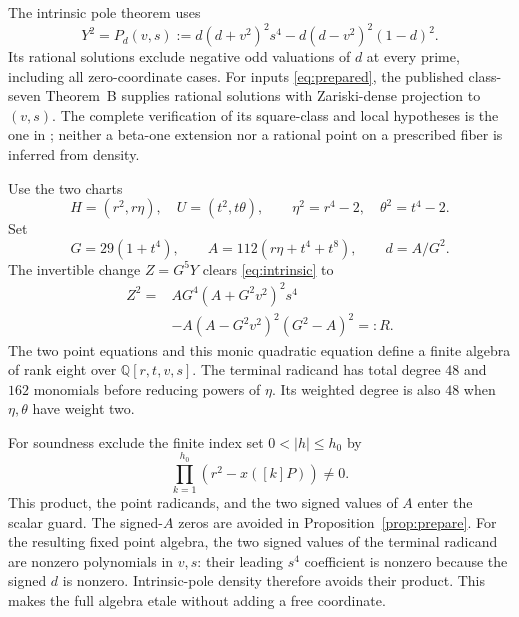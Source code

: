 \documentclass[11pt]{article}
\newcommand{\Q}{\mathbb Q}
\begin{document}
The intrinsic pole theorem \cite{Intrinsic,Burungale} uses
\begin{equation}\label{eq:intrinsic}
 Y^2=P_d(v,s)
   :=d(d+v^2)^2s^4-d(d-v^2)^2(1-d)^2.
\end{equation}
Its rational solutions exclude negative odd valuations of \(d\)
at every prime, including all zero-coordinate cases. For inputs
\eqref{eq:prepared}, the published class-seven Theorem~B supplies
rational solutions with Zariski-dense projection to \((v,s)\).
The complete verification of its square-class and local hypotheses
is the one in \cite{Intrinsic}; neither a beta-one extension nor
a rational point on a prescribed fiber is inferred from density.

Use the two charts
\[
 H=(r^2,r\eta),\quad U=(t^2,t\theta),\qquad
 \eta^2=r^4-2,\quad \theta^2=t^4-2.
\]
Set
\begin{equation}\label{eq:AG}
 G=29(1+t^4),\qquad A=112(r\eta+t^4+t^8),\qquad d=A/G^2.
\end{equation}
The invertible change \(Z=G^5Y\) clears \eqref{eq:intrinsic} to
\begin{equation}\label{eq:terminal}
\begin{split}
 Z^2={}&A G^4(A+G^2v^2)^2s^4\\
       &-A(A-G^2v^2)^2(G^2-A)^2=:R.
\end{split}
\end{equation}
The two point equations and this monic quadratic equation define
a finite algebra of rank eight over \(\Q[r,t,v,s]\).
The terminal radicand has total degree \(48\) and \(162\) monomials
before reducing powers of \(\eta\). Its weighted degree is also
\(48\) when \(\eta,\theta\) have weight two.

For soundness exclude the finite index set \(0<|h|\le h_0\) by
\[
                         \prod_{k=1}^{h_0}(r^2-x([k]P))\ne0.
\]
This product, the point radicands, and the two signed values
of \(A\) enter the scalar guard. The signed-\(A\) zeros are
avoided in Proposition~\ref{prop:prepare}. For the resulting
fixed point algebra, the two signed values of the terminal
radicand are nonzero polynomials in \(v,s\): their leading
\(s^4\) coefficient is nonzero because the signed \(d\) is
nonzero. Intrinsic-pole density therefore avoids their product.
This makes the full algebra etale without adding a free coordinate.
\end{document}

